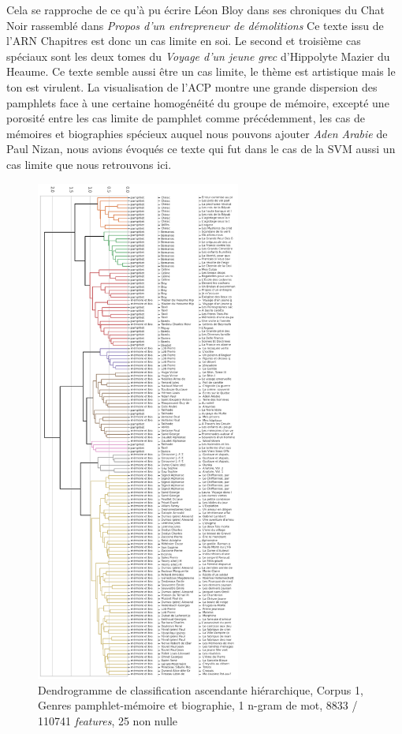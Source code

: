 Cela se rapproche de ce qu'à pu écrire Léon Bloy dans ses chroniques du Chat Noir rassemblé dans \textit{Propos d'un entrepreneur de démolitions} Ce texte issu de l'ARN Chapitres est donc un cas limite en soi. Le second et troisième cas spéciaux sont les deux tomes du \textit{Voyage d'un jeune grec} d'Hippolyte Mazier du Heaume. Ce texte semble aussi être un cas limite, le thème est artistique mais le ton est virulent.
La visualisation de l'ACP montre une grande dispersion des pamphlets face à une certaine homogénéité du groupe de mémoire, excepté une porosité entre les cas limite de pamphlet comme précédemment, les cas de mémoires et biographies spécieux auquel nous pouvons ajouter \textit{Aden Arabie} de Paul Nizan, nous avions évoqués ce texte qui fut dans le cas de la SVM aussi un cas limite que nous retrouvons ici.

\begin{figure}[H]
\centering %
\includegraphics[width=0.60\textwidth]{img/dendogram-corpus-mix-PamMem.png }
\caption{Dendrogramme de classification ascendante hiérarchique, Corpus 1, Genres pamphlet-mémoire et biographie, 1 n-gram de mot, 8833 / 110741 \textit{features}, 25 non nulle}
\label{'fig:dendogram-corpus-mix-PamMem'}
\end{figure}

